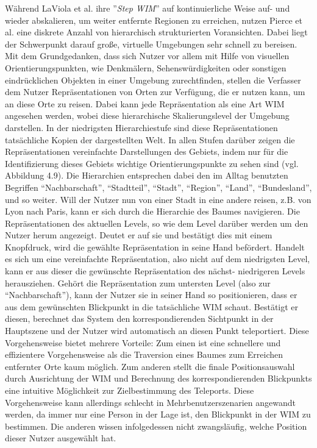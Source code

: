 Während LaViola et al. ihre ”\textit{Step WIM}” auf kontinuierliche Weise auf- und wieder abskalieren, um weiter entfernte Regionen zu erreichen, nutzen Pierce et al. \cite{pierce_representations} eine diskrete Anzahl von hierarchisch strukturierten Voransichten. Dabei liegt der Schwerpunkt darauf große, virtuelle Umgebungen sehr schnell zu bereisen.
Mit dem Grundgedanken, dass sich Nutzer vor allem mit Hilfe von visuellen Orientierungspunkten, wie Denkmälern, Sehenswürdigkeiten oder sonstigen eindrücklichen Objekten in einer Umgebung zurechtfinden, stellen die Verfasser dem Nutzer Repräsentationen von Orten zur Verfügung, die er nutzen kann, um an diese Orte zu reisen.
Dabei kann jede Repräsentation als eine Art WIM angesehen werden, wobei diese hierarchische Skalierungslevel der Umgebung darstellen. In der niedrigsten Hierarchiestufe sind diese Repräsentationen tatsächliche Kopien der dargestellten Welt. In allen Stufen darüber zeigen die Repräsentationen vereinfachte Darstellungen des Gebiets, indem nur für die Identifizierung dieses Gebiets wichtige Orientierungspunkte zu sehen sind (vgl. Abbildung 4.9).
Die Hierarchien entsprechen dabei den im Alltag benutzten Begriffen “Nachbarschaft”, “Stadtteil”, “Stadt”, “Region”, “Land”, “Bundesland”, und so weiter.
Will der Nutzer nun von einer Stadt in eine andere reisen, z.B. von Lyon nach Paris, kann er sich durch die Hierarchie des Baumes navigieren. Die Repräsentationen des aktuellen Levels, so wie dem Level darüber werden um den Nutzer herum angezeigt. Deutet er auf sie und bestätigt dies mit einem Knopfdruck, wird die gewählte Repräsentation in seine Hand befördert. Handelt es sich um eine vereinfachte Repräsentation, also nicht auf dem niedrigsten Level, kann er aus dieser die gewünschte Repräsentation des nächst- niedrigeren Levels herausziehen. 
Gehört die Repräsentation zum untersten Level (also zur “Nachbarschaft”), kann der Nutzer sie in seiner Hand so positionieren, dass er aus dem gewünschten Blickpunkt in die tatsächliche WIM schaut. Bestätigt er diesen, berechnet das System den korrespondierenden Sichtpunkt in der Hauptszene und der Nutzer wird automatisch an diesen Punkt teleportiert.
Diese Vorgehensweise bietet mehrere Vorteile: Zum einen ist eine schnellere und effizientere Vorgehensweise als die Traversion eines Baumes zum Erreichen entfernter Orte kaum möglich. Zum anderen stellt die finale Positionsauswahl durch Ausrichtung der WIM und Berechnung des korrespondierenden Blickpunkts eine intuitive Möglichkeit zur Zielbestimmung des Teleports. Diese Vorgehensweise kann allerdings schlecht in Mehrbenutzerszenarien angewandt werden, da immer nur eine Person in der Lage ist, den Blickpunkt in der WIM zu bestimmen. Die anderen wissen infolgedessen nicht zwangsläufig, welche Position dieser Nutzer ausgewählt hat.

